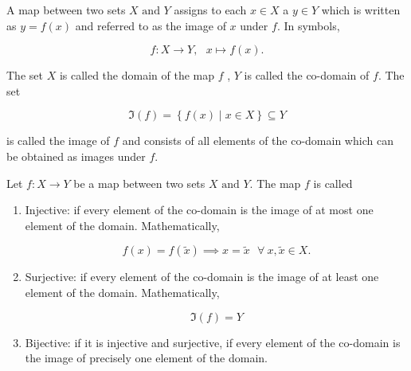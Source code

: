 \documentclass[a4paper,12pt]{report}
\begin{document}
\begin{definition}
A map between two sets \(X \text { and } Y\) assigns to each \(x \in  X \) a \(y \in Y\) which is written as \(y=f(x)\) and referred to as the image of \(x\) under \(f\). In symbols, 

\begin{equation}
    f:X \rightarrow Y,~~~  x \mapsto f(x).
\end{equation}

The set \(X\) is called the domain of the map \(f\) , \(Y\) is called the co-domain of \(f\). The set 

\begin{equation}
    \Im (f) = \left\{ f(x) \mid x \in  X \right\} \subseteq Y
\end{equation}

is called the image of \(f\) and consists of all elements of the co-domain which can be obtained as images under \(f\). 


\end{definition}

\begin{definition}
Let \(f:X \rightarrow Y\) be a map between two sets \(X \text { and } Y\). The map \(f\) is called

\begin{enumerate}
    \item Injective: if every element of the co-domain is the image of at most one element of the domain. Mathematically,
    
    \begin{equation}
        f(x) = f(\tilde{x} ) \implies x = \tilde{x} ~~~ \forall ~ x,\tilde{x} \in X.
    \end{equation}

    \item Surjective: if every element of the co-domain is the image of at least one element of the domain. Mathematically,
    
    \begin{equation}
        \Im (f) = Y
    \end{equation}
    
    \item Bijective: if it is injective and surjective, \ie if every element of the co-domain is the image of precisely one element of the domain.
   
\end{enumerate}

\end{definition}
\end{document}
